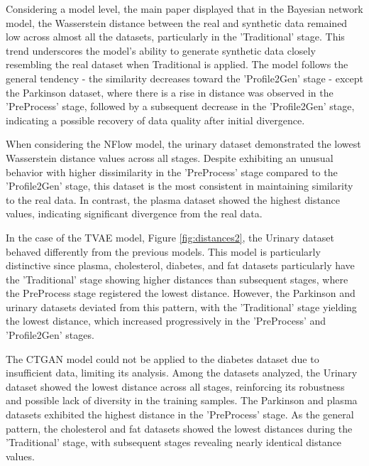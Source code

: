 \documentclass{article}
\theoremstyle{plain}
\theoremstyle{definition}
\theoremstyle{remark}
\begin{document}
Considering a model level, the main paper displayed that in the Bayesian network model, the Wasserstein distance between the real and synthetic data remained low across almost all the datasets, particularly in the 'Traditional' stage. This trend underscores the model's ability to generate synthetic data closely resembling the real dataset when Traditional is applied. The model follows the general tendency - the similarity decreases toward the 'Profile2Gen' stage - except the Parkinson dataset, where there is a rise in distance was observed in the 'PreProcess' stage, followed by a subsequent decrease in the 'Profile2Gen' stage, indicating a possible recovery of data quality after initial divergence.

When considering the NFlow model, the urinary dataset demonstrated the lowest Wasserstein distance values across all stages. Despite exhibiting an unusual behavior with higher dissimilarity in the 'PreProcess' stage compared to the 'Profile2Gen' stage, this dataset is the most consistent in maintaining similarity to the real data. In contrast, the plasma dataset showed the highest distance values, indicating significant divergence from the real data. 


In the case of the TVAE model, Figure \ref{fig:distances2}, the Urinary dataset behaved differently from the previous models. This model is particularly distinctive since plasma, cholesterol, diabetes, and fat datasets particularly have the 'Traditional' stage showing higher distances than subsequent stages, where the PreProcess stage registered the lowest distance. However, the Parkinson and urinary datasets deviated from this pattern, with the 'Traditional' stage yielding the lowest distance, which increased progressively in the 'PreProcess' and 'Profile2Gen' stages.

The CTGAN model could not be applied to the diabetes dataset due to insufficient data, limiting its analysis. Among the datasets analyzed, the Urinary dataset showed the lowest distance across all stages, reinforcing its robustness and possible lack of diversity in the training samples. The Parkinson and plasma datasets exhibited the highest distance in the 'PreProcess' stage. As the general pattern, the cholesterol and fat datasets showed the lowest distances during the 'Traditional' stage, with subsequent stages revealing nearly identical distance values.
\end{document}
